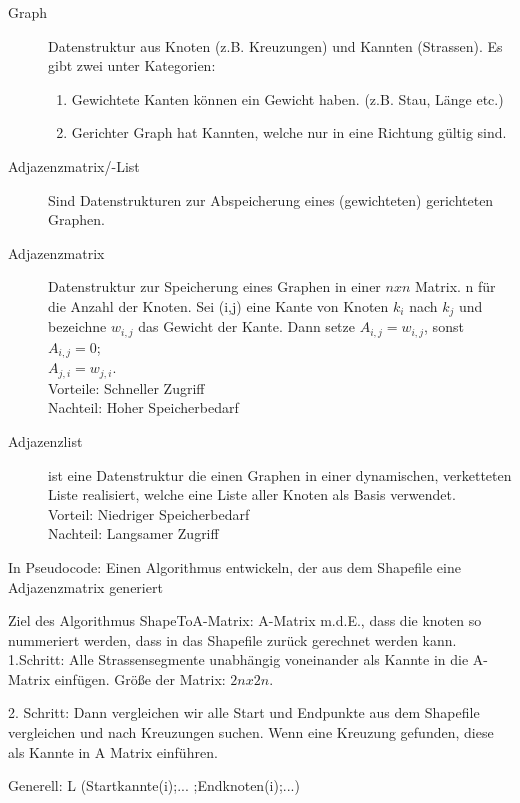 \begin{description}
    \item[Graph] Datenstruktur aus Knoten (z.B. Kreuzungen) und Kannten (Strassen).
    Es gibt zwei unter Kategorien:
    \begin{enumerate}
        \item Gewichtete Kanten können ein Gewicht haben. (z.B. Stau, Länge etc.)
        \item Gerichter Graph hat Kannten, welche nur in eine Richtung gültig sind.
    \end{enumerate}
    \item[Adjazenzmatrix/-List] Sind Datenstrukturen zur Abspeicherung eines (gewichteten) gerichteten Graphen.
    \item[Adjazenzmatrix] Datenstruktur zur Speicherung eines Graphen in einer $n x n$ Matrix. n für die Anzahl der Knoten.
    Sei (i,j) eine Kante von Knoten $k_i$ nach $k_j$ und bezeichne $w_{i,j}$ das Gewicht der Kante. Dann setze $A_{i,j} = w_{i,j}$,
    sonst $A_{i,j} = 0$; \\ $A_{j,i} = w_{j,i}$. \\
    Vorteile: Schneller Zugriff \\
    Nachteil: Hoher Speicherbedarf
    \item[Adjazenzlist] ist eine Datenstruktur die einen Graphen in einer dynamischen, verketteten Liste realisiert, welche eine Liste aller Knoten als Basis verwendet. \\
    Vorteil: Niedriger Speicherbedarf \\
    Nachteil: Langsamer Zugriff
\end{description}

In Pseudocode: Einen Algorithmus entwickeln, der aus dem Shapefile eine Adjazenzmatrix generiert

Ziel des Algorithmus ShapeToA-Matrix: A-Matrix m.d.E., dass die knoten so nummeriert werden, dass in das Shapefile zurück gerechnet werden kann. \\

1.Schritt:
Alle Strassensegmente unabhängig voneinander als Kannte in die A-Matrix einfügen. Größe der Matrix: $2n x 2n$.

2. Schritt:
Dann vergleichen wir alle Start und Endpunkte aus dem Shapefile vergleichen und nach Kreuzungen suchen.
Wenn eine Kreuzung gefunden, diese als Kannte in A Matrix einführen.


Generell: L (Startkannte(i);... ;Endknoten(i);...)

